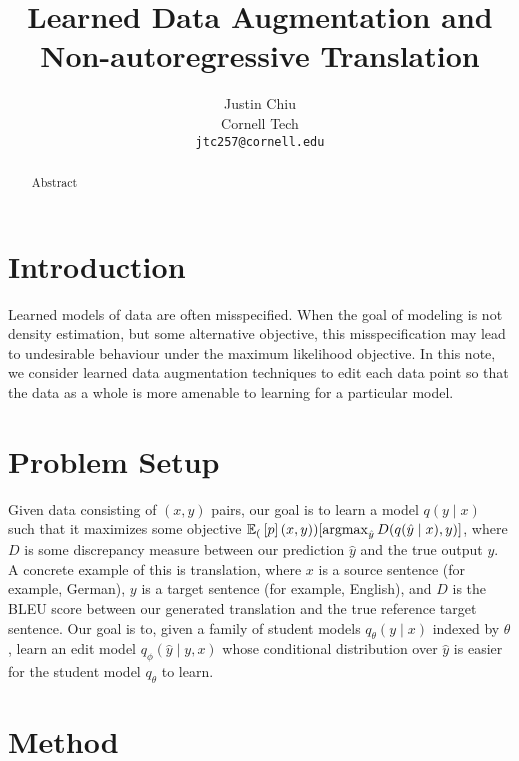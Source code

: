 \documentclass[11pt]{article}
\title{Learned Data Augmentation and Non-autoregressive Translation}
\author{Justin Chiu \\
  Cornell Tech \\
  \texttt{jtc257@cornell.edu}}
\begin{document}
\maketitle
\begin{abstract}
Abstract
\end{abstract}

\section{Introduction}
Learned models of data are often misspecified.
When the goal of modeling is not density estimation,
but some alternative objective, this misspecification may lead to undesirable
behaviour under the maximum likelihood objective.
In this note, we consider learned data augmentation techniques to edit
each data point so that the data as a whole is more amenable to learning for a particular model.

\section{Problem Setup}
Given data consisting of $(x,y)$ pairs, our goal is to learn a model $q(y \mid x)$
such that it maximizes some objective $\mathbb{E}_{(}\left[p\right](x,y))[\operatorname*{argmax}_{\hat{y}}D(q(\hat{y} \mid x), y)]$,
where $D$ is some discrepancy measure between our prediction $\hat{y}$ and the true output $y$.
A concrete example of this is translation, where $x$ is a source sentence (for example, German),
$y$ is a target sentence (for example, English),
and $D$ is the BLEU score between our generated translation and the true
reference target sentence.
Our goal is to, given a family of student models $q_\theta(y \mid x)$ indexed by $\theta$,
learn an edit model $q_\phi(\hat{y} \mid y, x)$ whose conditional distribution over $\hat{y}$
is easier for the student model $q_\theta$ to learn.

\section{Method}



\end{document}
